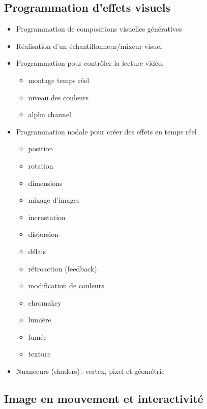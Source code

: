 \documentclass[
]{book}
\providecommand{\tightlist}{%
  \setlength{\itemsep}{0pt}\setlength{\parskip}{0pt}}
\begin{document}
\hypertarget{programmation-deffets-visuels}{%
\subsection{Programmation d'effets visuels}\label{programmation-deffets-visuels}}

\begin{itemize}
\tightlist
\item
  Programmation de compositions visuelles génératives
\item
  Réalisation d'un échantillonneur/mixeur visuel
\item
  Programmation pour contrôler la lecture vidéo,

  \begin{itemize}
  \tightlist
  \item
    montage temps réel
  \item
    niveau des couleurs
  \item
    alpha channel\\
  \end{itemize}
\item
  Programmation nodale pour créer des effets en temps réel

  \begin{itemize}
  \tightlist
  \item
    position
  \item
    rotation
  \item
    dimensions
  \item
    mixage d'images
  \item
    incrustation
  \item
    distorsion
  \item
    délais
  \item
    rétroaction (feedback)
  \item
    modification de couleurs
  \item
    chromakey
  \item
    lumière
  \item
    fumée
  \item
    texture
  \end{itemize}
\item
  Nuanceurs (shaders)\,: vertex, pixel et géométrie
\end{itemize}

\hypertarget{image-en-mouvement-et-interactivituxe9}{%
\subsection{Image en mouvement et interactivité}\label{image-en-mouvement-et-interactivituxe9}}
\end{document}
